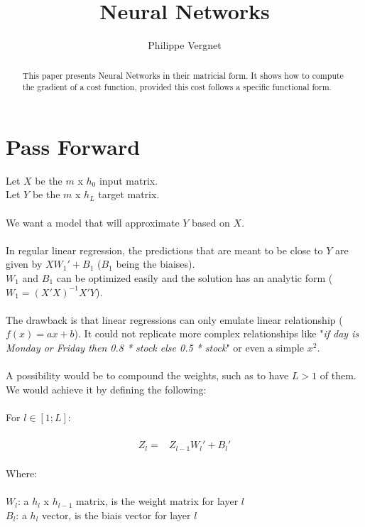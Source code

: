 \documentclass[]{article}
\title{Neural Networks}
\author{Philippe Vergnet}
\begin{document}
\allowdisplaybreaks


\maketitle

\begin{abstract}
This paper presents Neural Networks in their matricial form. It shows how to compute the gradient of a cost function, provided this cost follows a specific functional form.
\end{abstract}

\section{Pass Forward}

Let $X$ be the $m$ x $h_0$ input matrix.\\
Let $Y$ be the $m$ x $h_L$ target matrix.\\
\\
We want a model that will approximate $Y$ based on $X$.\\
\\
In regular linear regression, the predictions that are meant to be close to $Y$ are given by  $XW_1'+B_1$ ($B_1$ being the biaises).\\
$W_1$ and $B_1$ can be optimized easily and the solution has an analytic form ($W_1=(X'X)^{-1}X'Y$).\\
\\
The drawback is that linear regressions can only emulate linear relationship ($f(x)=ax+b$). It could not replicate more complex relationships like "{\it if day is Monday or Friday then 0.8 * stock else 0.5 * stock}" or even a simple $x^2$.\\
\\
A possibility would be to compound the weights, such as to have $L>1$ of them.\\
We would achieve it by defining the following:\\
\\
For $l \in [1;L]$:\\
\\
\begin{align*}
Z_l=&Z_{l-1}W_{l}'+B_{l}'
\end{align*}
\\
Where:\\
\\
$W_l$: a $h_l$ x $h_{l-1}$ matrix, is the weight matrix for layer $l$\\
$B_l$: a $h_l$ vector, is the biais vector for layer $l$\\
\end{document}
